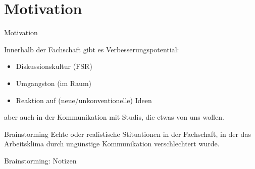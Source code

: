 \section{Motivation}

\begin{frame}[c]{Motivation}

    Innerhalb der Fachschaft gibt es Verbesserungspotential:

    \begin{itemize}[<+(1)->]
        \item Diskussionskultur (FSR)
        \item Umgangston (im Raum)
        \item Reaktion auf (neue/unkonventionelle) Ideen
    \end{itemize}
    \pause

    aber auch in der Kommunikation mit Studis, die etwas von uns wollen.

    \pause

    \begin{block}{Brainstorming}  %
        Echte oder realistische Stituationen in der Fachschaft, in der das
        Arbeitsklima durch ungünstige Kommunikation verschlechtert wurde.
    \end{block}

\end{frame}


\begin{frame}[c]{Brainstorming: Notizen}

\end{frame}
